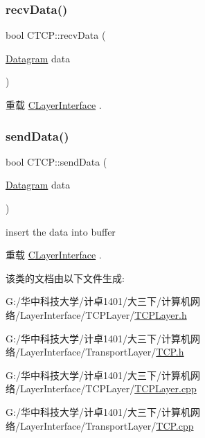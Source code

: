 \subsubsection{\texorpdfstring{recv\+Data()}{recvData()}}
{\footnotesize\ttfamily bool C\+T\+C\+P\+::recv\+Data (\begin{DoxyParamCaption}\item[{\hyperlink{class_datagram}{Datagram}}]{data }\end{DoxyParamCaption})\hspace{0.3cm}{\ttfamily [virtual]}}



重载 \hyperlink{class_c_layer_interface_a72415f0966b67359e0ee885d98827c3f}{C\+Layer\+Interface} .

\mbox{\label{class_c_t_c_p_a4552b74145e832f32c1cb45a9fa2a5e9}} 
\subsubsection{\texorpdfstring{send\+Data()}{sendData()}}
{\footnotesize\ttfamily bool C\+T\+C\+P\+::send\+Data (\begin{DoxyParamCaption}\item[{\hyperlink{class_datagram}{Datagram}}]{data }\end{DoxyParamCaption})\hspace{0.3cm}{\ttfamily [virtual]}}

insert the data into buffer 

重载 \hyperlink{class_c_layer_interface_ae5115cf6ee0e76247dac067cc797a06b}{C\+Layer\+Interface} .



该类的文档由以下文件生成\+:\begin{DoxyCompactItemize}
\item 
G\+:/华中科技大学/计卓1401/大三下/计算机网络/\+Layer\+Interface/\+T\+C\+P\+Layer/\hyperlink{_t_c_p_layer_8h}{T\+C\+P\+Layer.\+h}\item 
G\+:/华中科技大学/计卓1401/大三下/计算机网络/\+Layer\+Interface/\+Transport\+Layer/\hyperlink{_t_c_p_8h}{T\+C\+P.\+h}\item 
G\+:/华中科技大学/计卓1401/大三下/计算机网络/\+Layer\+Interface/\+T\+C\+P\+Layer/\hyperlink{_t_c_p_layer_8cpp}{T\+C\+P\+Layer.\+cpp}\item 
G\+:/华中科技大学/计卓1401/大三下/计算机网络/\+Layer\+Interface/\+Transport\+Layer/\hyperlink{_t_c_p_8cpp}{T\+C\+P.\+cpp}\end{DoxyCompactItemize}

